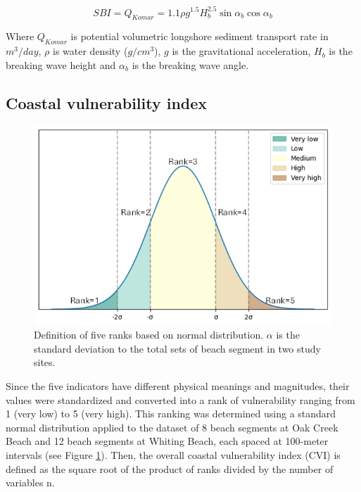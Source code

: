 \begin{equation}
    SBI = Q_{Komar} = 1.1 \rho g^{1.5} H_b^{2.5}\sin\alpha_b\cos\alpha_b
\end{equation}
\label{eq:eq5.5}

Where $Q_{Komar}$ is potential volumetric longshore sediment transport rate in
$m^3/day$, $\rho$ is water density ($g/cm^3$), $g$ is the gravitational
acceleration, $H_b$ is the breaking wave height and $\alpha_b$ is the breaking
wave angle.

\subsection{Coastal vulnerability index}
\label{Coastal vulnerability index}

\begin{figure}[htbp]
  \centering
  \includegraphics[width=1\textwidth]{chapter5/resources/five_ranks.png}
  \caption{Definition of five ranks based on normal distribution. $\alpha$ is the
  standard deviation to the total sets of beach segment in two study sites.}
  \label{fig:five_ranks}
\end{figure}

Since the five indicators have different physical meanings and magnitudes, their
values were standardized and converted into a rank of vulnerability ranging from
1 (very low) to 5 (very high). This ranking was determined using a standard
normal distribution applied to the dataset of 8 beach segments at Oak Creek
Beach and 12 beach segments at Whiting Beach, each spaced at 100-meter intervals
(see Figure \ref{fig:five_ranks}). Then, the overall coastal vulnerability index (CVI) is defined
as the square root of the product of ranks divided by the number of variables n.


